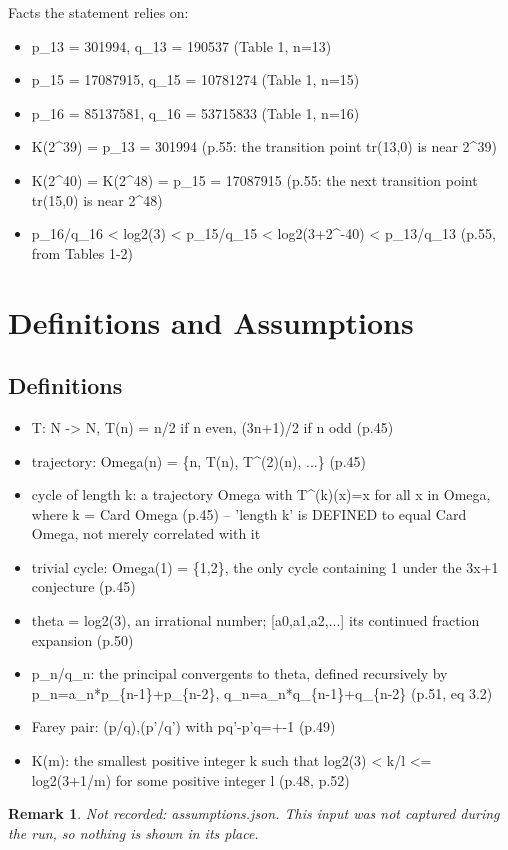 \documentclass[11pt]{article}
\newtheorem{remark}[theorem]{Remark}
\begin{document}
\noindent Facts the statement relies on:
\begin{itemize}
\item p\_13 = 301994, q\_13 = 190537 (Table 1, n=13)
\item p\_15 = 17087915, q\_15 = 10781274 (Table 1, n=15)
\item p\_16 = 85137581, q\_16 = 53715833 (Table 1, n=16)
\item K(2\textasciicircum{}39) = p\_13 = 301994 (p.55: the transition point tr(13,0) is near 2\textasciicircum{}39)
\item K(2\textasciicircum{}40) = K(2\textasciicircum{}48) = p\_15 = 17087915 (p.55: the next transition point tr(15,0) is near 2\textasciicircum{}48)
\item p\_16/q\_16 < log2(3) < p\_15/q\_15 < log2(3+2\textasciicircum{}-40) < p\_13/q\_13 (p.55, from Tables 1-2)
\end{itemize}
\section{Definitions and Assumptions}
\subsection*{Definitions}
\begin{itemize}
\item T: N -> N, T(n) = n/2 if n even, (3n+1)/2 if n odd (p.45)
\item trajectory: Omega(n) = \{n, T(n), T\textasciicircum{}(2)(n), ...\} (p.45)
\item cycle of length k: a trajectory Omega with T\textasciicircum{}(k)(x)=x for all x in Omega, where k = Card Omega (p.45) -- 'length k' is DEFINED to equal Card Omega, not merely correlated with it
\item trivial cycle: Omega(1) = \{1,2\}, the only cycle containing 1 under the 3x+1 conjecture (p.45)
\item theta = log2(3), an irrational number; [a0,a1,a2,...] its continued fraction expansion (p.50)
\item p\_n/q\_n: the principal convergents to theta, defined recursively by p\_n=a\_n*p\_\{n-1\}+p\_\{n-2\}, q\_n=a\_n*q\_\{n-1\}+q\_\{n-2\} (p.51, eq 3.2)
\item Farey pair: (p/q),(p'/q') with pq'-p'q=+-1 (p.49)
\item K(m): the smallest positive integer k such that log2(3) < k/l <= log2(3+1/m) for some positive integer l (p.48, p.52)
\end{itemize}
\begin{remark}\textit{Not recorded: assumptions.json.} This input was not captured during the run, so nothing is shown in its place.\end{remark}
\end{document}
